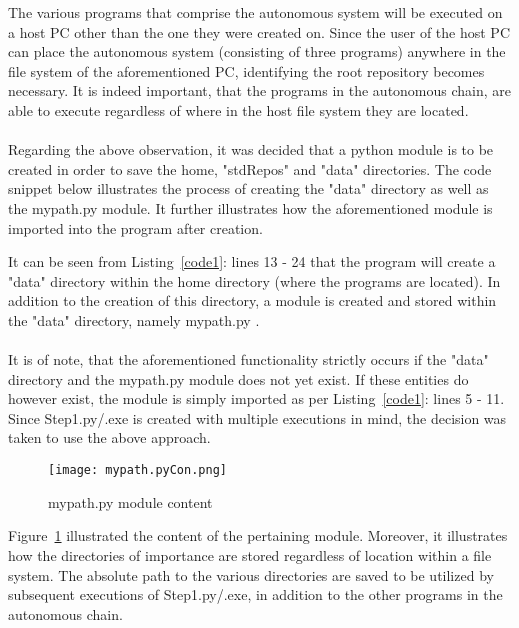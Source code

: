 The various programs that comprise the autonomous system will be executed on a host PC other than the one they were created on. Since the user of the host PC can place the autonomous system (consisting of three programs) anywhere in the file system of the aforementioned PC, identifying the root repository becomes necessary. It is indeed important, that the programs in the autonomous chain, are able to execute regardless of where in the host file system they are located. 
\\\\
Regarding the above observation, it was decided that a python module is to be created in order to save the home, "stdRepos" and "data" directories. The code snippet below illustrates the process of creating the "data" directory as well as the mypath.py module. It further illustrates how the aforementioned module is imported into the program after creation.



It can be seen from Listing~\ref{code1}: lines 13 - 24 that the program will create a "data" directory within the home directory (where the programs are located). In addition to the creation of this directory, a module is created and stored within the "data" directory, namely mypath.py \cite{Sweigart2015}.
\\\\
It is of note, that the aforementioned functionality strictly occurs if the "data" directory and the mypath.py module does not yet exist. If these entities do however exist, the module is simply imported as per  Listing~\ref{code1}: lines 5 - 11. Since Step1.py/.exe is created with multiple executions in mind, the decision was taken to use the above approach.

\begin{figure}[H]
\begin{center}
\texttt{[image: mypath.pyCon.png]}
\caption{mypath.py module content}
\label{mypath.pyCon}
\end{center}
\end{figure}

Figure~\ref{mypath.pyCon} illustrated the content of the pertaining module. Moreover, it illustrates how the directories of importance are stored regardless of location within a file system. The absolute path to the various directories are saved to be utilized by subsequent executions of Step1.py/.exe, in addition to the other programs in the autonomous chain.


